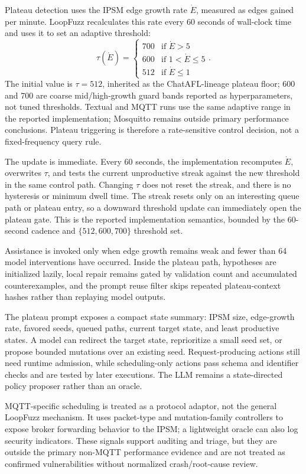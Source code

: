 \documentclass[final,5p,times,number]{elsarticle}
\begin{document}
Plateau detection uses the IPSM edge growth rate $\dot{E}$, measured as edges gained per minute. LoopFuzz recalculates this rate every 60 seconds of wall-clock time and uses it to set an adaptive threshold:
\[
\tau(\dot{E}) = \begin{cases}
700 & \text{if } \dot{E} > 5 \\
600 & \text{if } 1 < \dot{E} \le 5 \\
512 & \text{if } \dot{E} \le 1
\end{cases}.
\]
The initial value is $\tau{=}512$, inherited as the ChatAFL-lineage plateau floor; 600 and 700 are coarse mid/high-growth guard bands reported as hyperparameters, not tuned thresholds. Textual and MQTT runs use the same adaptive range in the reported implementation; Mosquitto remains outside primary performance conclusions. Plateau triggering is therefore a rate-sensitive control decision, not a fixed-frequency query rule.

The update is immediate. Every 60 seconds, the implementation recomputes $\dot{E}$, overwrites $\tau$, and tests the current unproductive streak against the new threshold in the same control path. Changing $\tau$ does not reset the streak, and there is no hysteresis or minimum dwell time. The streak resets only on an interesting queue path or plateau entry, so a downward threshold update can immediately open the plateau gate. This is the reported implementation semantics, bounded by the 60-second cadence and $\{512,600,700\}$ threshold set.

Assistance is invoked only when edge growth remains weak and fewer than 64 model interventions have occurred. Inside the plateau path, hypotheses are initialized lazily, local repair remains gated by validation count and accumulated counterexamples, and the prompt reuse filter skips repeated plateau-context hashes rather than replaying model outputs.

The plateau prompt exposes a compact state summary: IPSM size, edge-growth rate, favored seeds, queued paths, current target state, and least productive states. A model can redirect the target state, reprioritize a small seed set, or propose bounded mutations over an existing seed. Request-producing actions still need runtime admission, while scheduling-only actions pass schema and identifier checks and are tested by later executions. The LLM remains a state-directed policy proposer rather than an oracle.

MQTT-specific scheduling is treated as a protocol adaptor, not the general LoopFuzz mechanism. It uses packet-type and mutation-family controllers to expose broker forwarding behavior to the IPSM; a lightweight oracle can also log security indicators. These signals support auditing and triage, but they are outside the primary non-MQTT performance evidence and are not treated as confirmed vulnerabilities without normalized crash/root-cause review.
\end{document}
